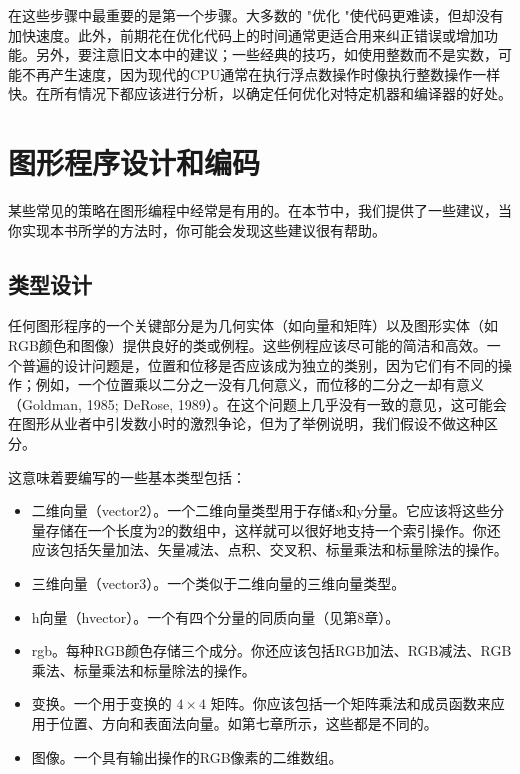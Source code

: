 \documentclass[lang=cn,10pt]{elegantbook}
\begin{document}
在这些步骤中最重要的是第一个步骤。大多数的 "优化 "使代码更难读，但却没有加快速度。此外，前期花在优化代码上的时间通常更适合用来纠正错误或增加功能。另外，要注意旧文本中的建议；一些经典的技巧，如使用整数而不是实数，可能不再产生速度，因为现代的CPU通常在执行浮点数操作时像执行整数操作一样快。在所有情况下都应该进行分析，以确定任何优化对特定机器和编译器的好处。

\section{图形程序设计和编码}

某些常见的策略在图形编程中经常是有用的。在本节中，我们提供了一些建议，当你实现本书所学的方法时，你可能会发现这些建议很有帮助。

\subsection{类型设计}

任何图形程序的一个关键部分是为几何实体（如向量和矩阵）以及图形实体（如RGB颜色和图像）提供良好的类或例程。这些例程应该尽可能的简洁和高效。一个普遍的设计问题是，位置和位移是否应该成为独立的类别，因为它们有不同的操作；例如，一个位置乘以二分之一没有几何意义，而位移的二分之一却有意义（Goldman, 1985; DeRose, 1989）。在这个问题上几乎没有一致的意见，这可能会在图形从业者中引发数小时的激烈争论，但为了举例说明，我们假设不做这种区分。



这意味着要编写的一些基本类型包括：

\begin{itemize}
  \item 二维向量（vector2）。一个二维向量类型用于存储x和y分量。它应该将这些分量存储在一个长度为2的数组中，这样就可以很好地支持一个索引操作。你还应该包括矢量加法、矢量减法、点积、交叉积、标量乘法和标量除法的操作。
  \item 三维向量（vector3）。一个类似于二维向量的三维向量类型。
  \item h向量（hvector）。一个有四个分量的同质向量（见第8章）。
  \item rgb。每种RGB颜色存储三个成分。你还应该包括RGB加法、RGB减法、RGB乘法、标量乘法和标量除法的操作。
  \item 变换。一个用于变换的 $4 \times 4$ 矩阵。你应该包括一个矩阵乘法和成员函数来应用于位置、方向和表面法向量。如第七章所示，这些都是不同的。
  \item 图像。一个具有输出操作的RGB像素的二维数组。
\end{itemize}
\end{document}
